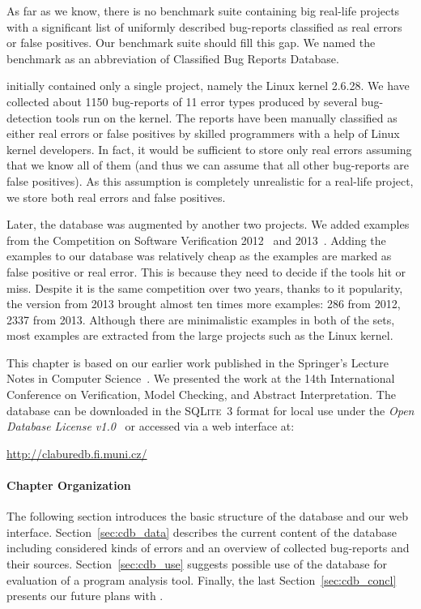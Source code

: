 As far as we know, there is no benchmark suite containing big real-life
projects with a significant list of uniformly described bug-reports
classified as real errors or false positives. Our benchmark suite should fill
this gap. We named the benchmark \cdb as an abbreviation of Classified Bug
Reports Database.

\cdb initially contained only a single project, namely the Linux kernel
2.6.28. We have collected about 1150 bug-reports of 11 error types produced by
several bug-detection tools run on the kernel. The reports have been manually
classified as either real errors or false positives by skilled programmers
with a help of Linux kernel developers. In fact, it would be sufficient to
store only real errors assuming that we know all of them (and thus we can
assume that all other bug-reports are false positives). As this assumption is
completely unrealistic for a real-life project, we store both real errors and
false positives.

Later, the database was augmented by another two projects. We added examples
from the Competition on Software Verification 2012~\cite{sv-comp12} and
2013~\cite{sv-comp13}. Adding the examples to our database was relatively
cheap as the examples are marked as false positive or real error. This is
because they need to decide if the tools hit or miss. Despite it is the same
competition over two years, thanks to it popularity, the version from 2013
brought almost ten times more examples: 286 from 2012, 2337 from 2013.
Although there are minimalistic examples in both of the sets, most examples
are extracted from the large projects such as the Linux kernel.

This chapter is based on our earlier work published in the Springer's
Lecture Notes in Computer Science~\cite{claburedb}. We presented the work at
the 14th International Conference on Verification, Model Checking, and
Abstract Interpretation.  The database can be downloaded in the
\textsc{SQLite~3} format for local use under the \emph{Open Database License
v1.0}~\cite{ODbL} or accessed via a web interface at:
\begin{center}
  \url{http://claburedb.fi.muni.cz/}
\end{center}

\paragraph{Chapter Organization} The following section introduces the basic
structure of the database and our web interface. Section~\ref{sec:cdb_data}
describes the current content of the database including considered kinds of
errors and an overview of collected bug-reports and their sources.
Section~\ref{sec:cdb_use} suggests possible use of the database for evaluation
of a program analysis tool. Finally, the last Section~\ref{sec:cdb_concl}
presents our future plans with \cdb.


